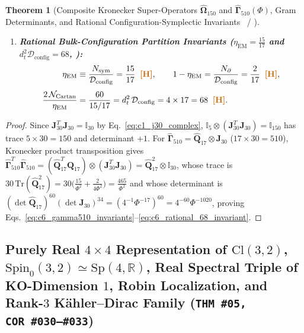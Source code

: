 \documentclass[11pt,a4paper]{article}
\newcommand{\catD}{\text{\textbf{\textcolor{blue!75!black}{[D]}}}}
\newcommand{\catH}{\text{\textbf{\textcolor{orange!80!black}{[H]}}}}
\theoremstyle{definition}
\theoremstyle{plain}
\newtheorem{theorem}[axiom]{Theorem}
\theoremstyle{remark}
\begin{document}
\begin{theorem}[Composite Kronecker Super-Operators $\widehat{\mathbf{\Omega}}_{150}$ and $\widehat{\mathbf{\Gamma}}_{510}(\Phi)$, Gram Determinants, and Rational Configuration-Symplectic Invariants \catD\ / \catH]
\begin{enumerate}[label=(\roman*)]
\begin{align}
  \left|\det\!\left(\widehat{\mathbf{\Gamma}}_{510}(\Phi)\right)\right| = 4^{-30}\,\Phi^{-510} > 0 \;\;\catD. \label{eq:c6_gamma510_invariants}
  \end{align}
  \item \textbf{Rational Bulk-Configuration Partition Invariants ($\eta_{\mathrm{EM}} = \frac{15}{17}$ and $d_t^2\mathcal{D}_{\mathrm{config}} = 68$, \catH):}
  \begin{align}
  \eta_{\mathrm{EM}} &\equiv \frac{N_{\mathrm{sym}}}{\mathcal{D}_{\mathrm{config}}} = \frac{15}{17} \;\;\catH, \qquad
  1 - \eta_{\mathrm{EM}} = \frac{N_\partial}{\mathcal{D}_{\mathrm{config}}} = \frac{2}{17} \;\;\catH, \nonumber \\[4pt]
  \frac{2\,\mathcal{N}_{\mathrm{Cartan}}}{\eta_{\mathrm{EM}}} &= \frac{60}{15/17} = d_t^2\,\mathcal{D}_{\mathrm{config}} = 4 \times 17 = 68 \;\;\catH. \label{eq:c6_rational_68_invariant}
  \end{align}
\end{enumerate}
\end{theorem}

\begin{proof}
Since $\mathbf{J}_{30}^T\mathbf{J}_{30} = \mathbb{I}_{30}$ by Eq.~\eqref{eq:c1_j30_complex}, $\mathbb{I}_5 \otimes (\mathbf{J}_{30}^T\mathbf{J}_{30}) = \mathbb{I}_{150}$ has trace $5 \times 30 = 150$ and determinant $+1$. For $\widehat{\mathbf{\Gamma}}_{510} = \widehat{\mathbf{Q}}_{17} \otimes \mathbf{J}_{30}$ ($17 \times 30 = 510$), Kronecker product transposition gives $\widehat{\mathbf{\Gamma}}_{510}^T\widehat{\mathbf{\Gamma}}_{510} = (\widehat{\mathbf{Q}}_{17}^T\widehat{\mathbf{Q}}_{17}) \otimes (\mathbf{J}_{30}^T\mathbf{J}_{30}) = \widehat{\mathbf{Q}}_{17}^2 \otimes \mathbb{I}_{30}$, whose trace is $30\,\mathrm{Tr}(\widehat{\mathbf{Q}}_{17}^2) = 30\big(\frac{15}{\Phi^2} + \frac{2}{4\Phi^2}\big) = \frac{465}{\Phi^2}$ and whose determinant is $(\det\widehat{\mathbf{Q}}_{17})^{60}(\det\mathbf{J}_{30})^{34} = (4^{-1}\Phi^{-17})^{60} = 4^{-60}\Phi^{-1020}$, proving Eqs.~\eqref{eq:c6_gamma510_invariants}--\eqref{eq:c6_rational_68_invariant}.
\end{proof}

\subsection{\texorpdfstring{Purely Real $4\times 4$ Representation of $\mathrm{Cl}(3,2)$, $\mathrm{Spin}_0(3,2) \simeq \mathrm{Sp}(4,\mathbb{R})$, Real Spectral Triple of KO-Dimension $1$, Robin Localization, and Rank-$3$ K\"ahler--Dirac Family (\texttt{THM~\#05, COR~\#030--\#033})}{Purely Real 4x4 Representation of Cl(3,2), Spin\_0(3,2) = Sp(4,R), KO-Dimension 1, Robin Localization, and Rank-3 Kahler-Dirac Family}}
\end{document}
